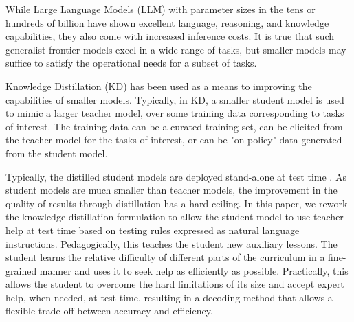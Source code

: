 While Large Language Models (LLM) with parameter sizes in the tens or hundreds of billion \cite{dettmers2022gpt3} \cite{metallama3} have shown excellent language, reasoning, and knowledge capabilities, they also come with increased inference costs. It is true that such generalist frontier models excel in a wide-range of tasks, but smaller models may suffice to satisfy the operational needs for a subset of tasks.

Knowledge Distillation (KD) \cite{hinton2015distilling} has been used as a means to improving the capabilities of smaller models. Typically, in KD, a smaller student model is used to mimic a larger teacher model, over some training data corresponding to tasks of interest. The training data can be a curated training set, can be elicited from the teacher model for the tasks of interest, or can be "on-policy" data generated from the student model.

Typically, the distilled student models are deployed stand-alone at test time \cite{agarwal2024policy} \cite{gu2023minillm}.  As student models are much smaller than teacher models, the improvement in the quality of results through distillation has a hard ceiling. In this paper, we rework the knowledge distillation formulation to allow the student model to use teacher help at test time based on testing rules expressed as natural language instructions. Pedagogically, this teaches the student new auxiliary lessons. The student learns the relative difficulty of different parts of the curriculum in a fine-grained manner and uses it to seek help as efficiently as possible. Practically, this allows the student to overcome the hard limitations of its size and accept expert help, when needed, at test time, resulting in a decoding method that allows a flexible trade-off between accuracy and efficiency.

